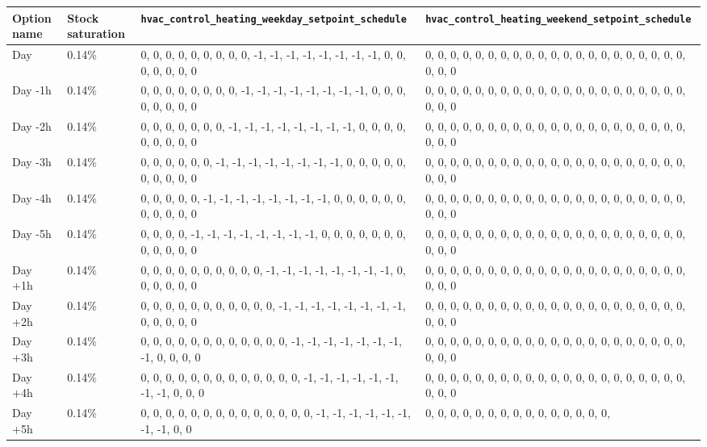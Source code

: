 \begin{longtable}[]{@{}llll@{}}
\toprule\noalign{}
Option name & Stock saturation &
\texttt{hvac\_control\_heating\_weekday\_setpoint\_schedule} &
\texttt{hvac\_control\_heating\_weekend\_setpoint\_schedule} \\
\midrule\noalign{}
\endhead
\bottomrule\noalign{}
\endlastfoot
Day & 0.14\% & 0, 0, 0, 0, 0, 0, 0, 0, 0, -1, -1, -1, -1, -1, -1, -1,
-1, 0, 0, 0, 0, 0, 0, 0 & 0, 0, 0, 0, 0, 0, 0, 0, 0, 0, 0, 0, 0, 0, 0,
0, 0, 0, 0, 0, 0, 0, 0, 0 \\
Day -1h & 0.14\% & 0, 0, 0, 0, 0, 0, 0, 0, -1, -1, -1, -1, -1, -1, -1,
-1, 0, 0, 0, 0, 0, 0, 0, 0 & 0, 0, 0, 0, 0, 0, 0, 0, 0, 0, 0, 0, 0, 0,
0, 0, 0, 0, 0, 0, 0, 0, 0, 0 \\
Day -2h & 0.14\% & 0, 0, 0, 0, 0, 0, 0, -1, -1, -1, -1, -1, -1, -1, -1,
0, 0, 0, 0, 0, 0, 0, 0, 0 & 0, 0, 0, 0, 0, 0, 0, 0, 0, 0, 0, 0, 0, 0, 0,
0, 0, 0, 0, 0, 0, 0, 0, 0 \\
Day -3h & 0.14\% & 0, 0, 0, 0, 0, 0, -1, -1, -1, -1, -1, -1, -1, -1, 0,
0, 0, 0, 0, 0, 0, 0, 0, 0 & 0, 0, 0, 0, 0, 0, 0, 0, 0, 0, 0, 0, 0, 0, 0,
0, 0, 0, 0, 0, 0, 0, 0, 0 \\
Day -4h & 0.14\% & 0, 0, 0, 0, 0, -1, -1, -1, -1, -1, -1, -1, -1, 0, 0,
0, 0, 0, 0, 0, 0, 0, 0, 0 & 0, 0, 0, 0, 0, 0, 0, 0, 0, 0, 0, 0, 0, 0, 0,
0, 0, 0, 0, 0, 0, 0, 0, 0 \\
Day -5h & 0.14\% & 0, 0, 0, 0, -1, -1, -1, -1, -1, -1, -1, -1, 0, 0, 0,
0, 0, 0, 0, 0, 0, 0, 0, 0 & 0, 0, 0, 0, 0, 0, 0, 0, 0, 0, 0, 0, 0, 0, 0,
0, 0, 0, 0, 0, 0, 0, 0, 0 \\
Day +1h & 0.14\% & 0, 0, 0, 0, 0, 0, 0, 0, 0, 0, -1, -1, -1, -1, -1, -1,
-1, -1, 0, 0, 0, 0, 0, 0 & 0, 0, 0, 0, 0, 0, 0, 0, 0, 0, 0, 0, 0, 0, 0,
0, 0, 0, 0, 0, 0, 0, 0, 0 \\
Day +2h & 0.14\% & 0, 0, 0, 0, 0, 0, 0, 0, 0, 0, 0, -1, -1, -1, -1, -1,
-1, -1, -1, 0, 0, 0, 0, 0 & 0, 0, 0, 0, 0, 0, 0, 0, 0, 0, 0, 0, 0, 0, 0,
0, 0, 0, 0, 0, 0, 0, 0, 0 \\
Day +3h & 0.14\% & 0, 0, 0, 0, 0, 0, 0, 0, 0, 0, 0, 0, -1, -1, -1, -1,
-1, -1, -1, -1, 0, 0, 0, 0 & 0, 0, 0, 0, 0, 0, 0, 0, 0, 0, 0, 0, 0, 0,
0, 0, 0, 0, 0, 0, 0, 0, 0, 0 \\
Day +4h & 0.14\% & 0, 0, 0, 0, 0, 0, 0, 0, 0, 0, 0, 0, 0, -1, -1, -1,
-1, -1, -1, -1, -1, 0, 0, 0 & 0, 0, 0, 0, 0, 0, 0, 0, 0, 0, 0, 0, 0, 0,
0, 0, 0, 0, 0, 0, 0, 0, 0, 0 \\
Day +5h & 0.14\% & 0, 0, 0, 0, 0, 0, 0, 0, 0, 0, 0, 0, 0, 0, -1, -1, -1,
-1, -1, -1, -1, -1, 0, 0 & 0, 0, 0, 0, 0, 0, 0, 0, 0, 0, 0, 0, 0, 0, 0,

\end{longtable}
